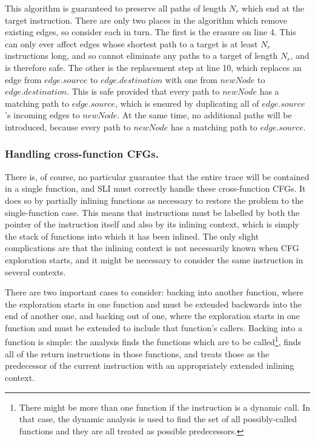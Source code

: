This algorithm is guaranteed to preserve all paths of length $N_r$
which end at the target instruction.  There are only two places in the
algorithm which remove existing edges, so consider each in turn.  The
first is the erasure on line 4.  This can only ever affect edges whose
shortest path to a target is at least $N_r$ instructions long, and so
cannot eliminate any paths to a target of length $N_r$, and is
therefore safe.  The other is the replacement step at line 10, which
replaces an edge from $edge.source$ to $edge.destination$ with one
from $newNode$ to $edge.destination$.  This is safe provided that
every path to $newNode$ has a matching path to $edge.source$, which is
ensured by duplicating all of $edge.source$'s incoming edges to
$newNode$.  At the same time, no additional paths will be introduced,
because every path to $newNode$ has a matching path to $edge.source$.


\subsubsection{Handling cross-function CFGs.}

There is, of course, no particular guarantee that the entire trace
will be contained in a single function, and SLI must correctly handle
these cross-function CFGs.  It does so by partially inlining functions
as necessary to restore the problem to the single-function case.  This
means that instructions must be labelled by both the pointer of the
instruction itself and also by its inlining context, which is simply
the stack of functions into which it has been inlined.  The only slight complications are that the
inlining context is not necessarily known when CFG exploration starts,
and it might be necessary to consider the same instruction in several
contexts.

There are two important cases to consider: backing into another
function, where the exploration starts in one function and must be
extended backwards into the end of another one, and backing out of
one, where the exploration starts in one function and must be extended
to include that function's callers.  Backing into a function is
simple: the analysis finds the functions which are to be
called\footnote{There might be more than one function if the
  instruction is a dynamic call.  In that case, the dynamic analysis
  is used to find the set of all possibly-called functions and they
  are all treated as possible predecessors.}, finds all of the return
instructions in those functions, and treats those as the predecessor
of the current instruction with an appropriately extended inlining
context.

